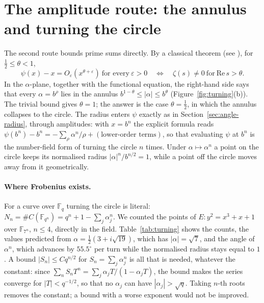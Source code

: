 \documentclass[11pt,a4paper]{article}
\theoremstyle{definition}\newtheorem{definition}[proposition]{Definition}
\theoremstyle{remark}\newtheorem{remark}[proposition]{Remark}
\begin{document}
\section{The amplitude route: the annulus and turning the circle}\label{sec:amplitude}
The second route bounds prime sums directly. By a classical theorem (see \cite[Ch.~IV]{Ingham1932}), for $\tfrac12\le\theta<1$,
\begin{equation}\label{eq:annulus}
\psi(x)-x=O_\varepsilon(x^{\theta+\varepsilon})\ \text{for every}\ \varepsilon>0
\quad\Longleftrightarrow\quad
\zeta(s)\neq0\ \text{for}\ \mathrm{Re}\,s>\theta .
\end{equation}
In the $\alpha$-plane, together with the functional equation, the right-hand side says that every $\alpha=b^\rho$ lies in the annulus $b^{1-\theta}\le|\alpha|\le b^{\theta}$ (Figure~\ref{fig:turning}(b)). The trivial bound gives $\theta=1$; the answer is the case $\theta=\tfrac12$, in which the annulus collapses to the circle. The radius enters $\psi$ exactly as in Section~\ref{sec:angle-radius}, through amplitudes: with $x=b^n$ the explicit formula reads $\psi(b^n)-b^n=-\sum_\rho\alpha^n/\rho+(\text{lower-order terms})$, so that evaluating $\psi$ at $b^n$ is the number-field form of turning the circle $n$ times. Under $\alpha\mapsto\alpha^n$ a point on the circle keeps its normalised radius $|\alpha|^n/b^{n/2}=1$, while a point off the circle moves away from it geometrically.

\paragraph{Where Frobenius exists.} For a curve over $\mathbb F_q$ turning the circle is literal: $N_n=\#C(\mathbb F_{q^n})=q^n+1-\sum_j\alpha_j^n$. We counted the points of $E\colon y^2=x^3+x+1$ over $\mathbb F_{7^n}$, $n\le4$, directly in the field. Table~\ref{tab:turning} shows the counts, the values predicted from $\alpha=\tfrac12(3+i\sqrt{19})$, which has $|\alpha|=\sqrt7$, and the angle of $\alpha^n$, which advances by $55.5^\circ$ per turn while the normalised radius stays equal to $1$. A bound $|S_n|\le Cq^{n/2}$ for $S_n=\sum_j\alpha_j^n$ is all that is needed, whatever the constant: since $\sum_nS_nT^n=\sum_j\alpha_jT/(1-\alpha_jT)$, the bound makes the series converge for $|T|<q^{-1/2}$, so that no $\alpha_j$ can have $|\alpha_j|>\sqrt q$. Taking $n$-th roots removes the constant; a bound with a worse exponent would not be improved.
\end{document}
